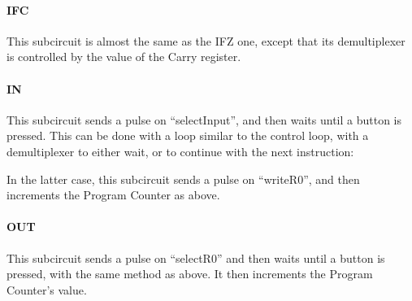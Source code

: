 \begin{center}
  
\end{center}

\paragraph{IFC} This subcircuit is almost the same as the IFZ one,
except that its demultiplexer is controlled by the value of the Carry register.

\medskip \paragraph{IN} This subcircuit sends a pulse on ``selectInput'', and
then waits until a button is pressed. This can be done with a loop similar to
the control loop, with a demultiplexer to either wait, or to continue with the
next instruction:

\begin{center}
  
\end{center}

\noindent In the latter case, this subcircuit sends a pulse on ``writeR0'', and
then increments the Program Counter as above.

\medskip \paragraph{OUT} This subcircuit sends a pulse on ``selectR0'' and then
waits until a button is pressed, with the same method as above. It then
increments the Program Counter's value.
